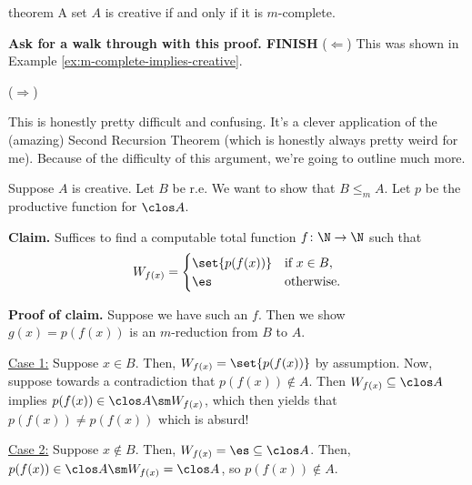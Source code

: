 \documentclass[class=article, crop=false]{standalone}
\begin{document}
\begin{result}{theorem}{\label{thm:creative-iff-m-complete}}
  A set $A$ is creative if and only if it is $m$-complete.
\end{result}
\begin{pf}
  \textbf{Ask for a walk through with this proof. FINISH}
  ($\Leftarrow$) This was shown in Example \ref{ex:m-complete-implies-creative}.

  ($\Rightarrow$)

  \begin{rem}
    This is honestly pretty difficult and confusing. It's a clever application of the (amazing) Second Recursion Theorem (which is honestly always pretty weird for me). Because of the difficulty of this argument, we're going to outline much more.
  \end{rem}

  Suppose $A$ is creative. Let $B$ be r.e. We want to show that $B \leq_m A$. Let $p$ be the productive function for $\clos A$.

  \textbf{Claim.} Suffices to find a computable total function $f\colon \N \to \N$ such that
    \[
      W_{f(x)} =
        \begin{cases}
          \set{p(f(x))} & \text{if } x\in B, \\
          \es & \text{otherwise}.
        \end{cases}
    \]

  \textbf{Proof of claim.} Suppose we have such an $f$. Then we show $g(x) = p(f(x))$ is an $m$-reduction from $B$ to $A$.

  \underline{Case 1:} Suppose $x \in B$. Then, $W_{f(x)} = \set{p(f(x))}$ by assumption. Now, suppose towards a contradiction that $p(f(x)) \nin A$. Then $W_{f(x)} \subseteq \clos A$ implies $p(f(x)) \in \clos A \sm W_{f(x)}$, which then yields that $p(f(x)) \neq p(f(x))$ which is absurd!

  \underline{Case 2:} Suppose $x \nin B$. Then, $W_{f(x)} = \es \subseteq \clos A$. Then, $p(f(x)) \in \clos A \sm W_{f(x)} = \clos A$, so $p(f(x)) \nin A$.



\end{pf}
\end{document}
